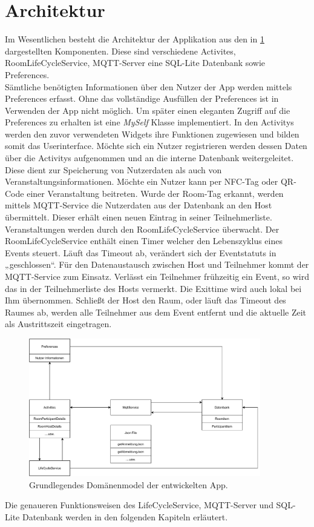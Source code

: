 \section{Architektur}
\label{sec:Architektur}
Im Wesentlichen besteht die Architektur der Applikation aus den in \cref{img:dmodel} dargestellten Komponenten. 
Diese sind verschiedene Activites, RoomLifeCycleService, MQTT-Server eine SQL-Lite Datenbank sowie Preferences.\\
Sämtliche benötigten Informationen über den Nutzer der App werden mittels Preferences erfasst. 
Ohne das vollständige Ausfüllen der Preferences ist in Verwenden der App nicht möglich. 
Um später einen eleganten Zugriff auf die Preferences zu erhalten ist eine \textit{MySelf} Klasse implementiert. 
In den Activitys werden den zuvor verwendeten Widgets ihre Funktionen zugewiesen und bilden somit das Userinterface.
 Möchte sich ein Nutzer registrieren werden dessen Daten über die Activitys aufgenommen und an die interne Datenbank weitergeleitet. 
Diese dient zur Speicherung von Nutzerdaten als auch von Veranstaltungsinformationen. 
Möchte ein Nutzer kann per NFC-Tag oder QR-Code einer Veranstaltung beitreten.
 Wurde der Room-Tag erkannt, werden mittels MQTT-Service die Nutzerdaten aus der Datenbank  an den Host übermittelt.
 Dieser erhält einen neuen Eintrag in seiner Teilnehmerliste.
Veranstaltungen werden durch den RoomLifeCycleService überwacht. Der RoomLifeCycleService enthält einen Timer welcher den Lebenszyklus eines Events steuert. 
Läuft das Timeout ab, verändert sich der Eventstatuts in „geschlossen“. 
Für den Datenaustausch zwischen Host und Teilnehmer kommt der MQTT-Service zum Einsatz. 
Verlässt ein Teilnehmer frühzeitig ein Event, so wird das in der Teilnehmerliste des Hosts vermerkt. Die Exittime wird auch lokal bei Ihm übernommen. 
Schließt der Host den Raum, oder läuft das Timeout des Raumes ab, werden alle Teilnehmer aus dem Event entfernt und die aktuelle Zeit als Austrittszeit eingetragen. 
\begin{figure}
	\centering
	\includegraphics[width =0.9\textwidth]{images/DomaenenModel.pdf}
	\caption{Grundlegendes Domänenmodel der entwickelten App.}
	\label{img:dmodel}
\end{figure}
Die genaueren Funktionsweisen des LifeCycleService, MQTT-Server und SQL-Lite Datenbank werden in den folgenden Kapiteln erläutert.


